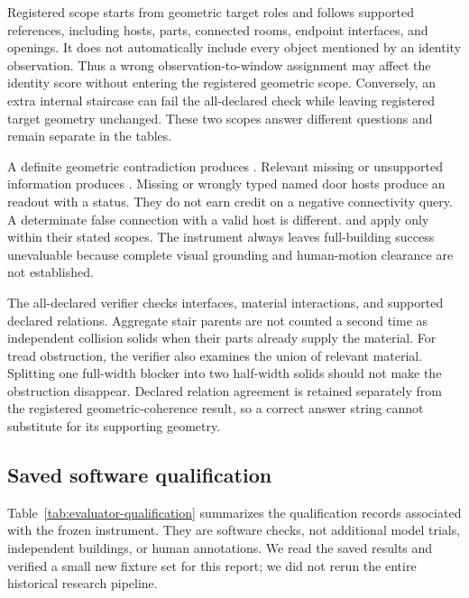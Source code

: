 Registered scope starts from geometric target roles and follows supported references, including hosts, parts, connected rooms, endpoint interfaces, and openings. It does not automatically include every object mentioned by an identity observation. Thus a wrong observation-to-window assignment may affect the identity score without entering the registered geometric scope. Conversely, an extra internal staircase can fail the all-declared check while leaving registered target geometry unchanged. These two scopes answer different questions and remain separate in the tables.

A definite geometric contradiction produces . Relevant missing or unsupported information produces \neval. Missing or wrongly typed named door hosts produce an  readout with a  status. They do not earn credit on a negative connectivity query. A determinate false connection with a valid host is different.  and  apply only within their stated scopes. The instrument always leaves full-building success unevaluable because complete visual grounding and human-motion clearance are not established.

The all-declared verifier checks interfaces, material interactions, and supported declared relations. Aggregate stair parents are not counted a second time as independent collision solids when their parts already supply the material. For tread obstruction, the verifier also examines the union of relevant material. Splitting one full-width blocker into two half-width solids should not make the obstruction disappear. Declared relation agreement is retained separately from the registered geometric-coherence result, so a correct answer string cannot substitute for its supporting geometry.

\subsection{Saved software qualification}
Table~\ref{tab:evaluator-qualification} summarizes the qualification records associated with the frozen instrument. They are software checks, not additional model trials, independent buildings, or human annotations. We read the saved results and verified a small new fixture set for this report; we did not rerun the entire historical research pipeline.

